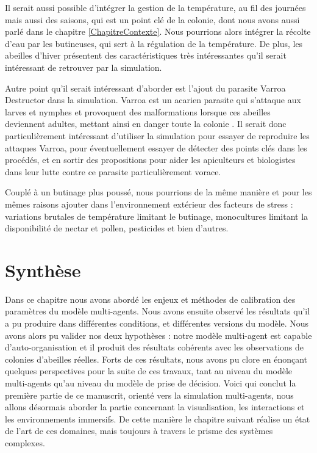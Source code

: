 	Il serait aussi possible d'intégrer la gestion de la température, au fil des journées mais aussi des saisons, qui est un point clé de la colonie, dont nous avons aussi parlé dans le chapitre \ref{ChapitreContexte}. Nous pourrions alors intégrer la récolte d'eau par les butineuses, qui sert à la régulation de la température. De plus, les abeilles d'hiver présentent des caractéristiques très intéressantes qu'il serait intéressant de retrouver par la simulation. 
	
	Autre point qu'il serait intéressant d'aborder est l'ajout du parasite Varroa Destructor dans la simulation. Varroa est un acarien parasite qui s'attaque aux larves et nymphes et provoquent des malformations lorsque ces abeilles deviennent adultes, mettant ainsi en danger toute la colonie \cite{le_conte_varroa_2010}. Il serait donc particulièrement intéressant d'utiliser la simulation pour essayer de reproduire les attaques Varroa, pour éventuellement essayer de détecter des points clés dans les procédés, et en sortir des propositions pour aider les apiculteurs et biologistes dans leur lutte contre ce parasite particulièrement vorace.
	
	Couplé à un butinage plus poussé, nous pourrions de la même manière et pour les mêmes raisons ajouter dans l'environnement extérieur des facteurs de stress : variations brutales de température limitant le butinage, monocultures limitant la disponibilité de nectar et pollen, pesticides et bien d'autres.
	
	
			
	\section*{Synthèse}
	Dans ce chapitre nous avons abordé les enjeux et méthodes de calibration des paramètres du modèle multi-agents. Nous avons ensuite observé les résultats qu'il a pu produire dans différentes conditions, et différentes versions du modèle. Nous avons alors pu valider nos deux hypothèses : notre modèle multi-agent est capable d'auto-organisation et il produit des résultats cohérents avec les observations de colonies d'abeilles réelles. Forts de ces résultats, nous avons pu clore en énonçant quelques perspectives pour la suite de ces travaux, tant au niveau du modèle multi-agents qu'au niveau du modèle de prise de décision. Voici qui conclut la première partie de ce manuscrit, orienté vers la simulation multi-agents, nous allons désormais aborder la partie concernant la visualisation, les interactions et les environnements immersifs. De cette manière le chapitre suivant réalise un état de l'art de ces domaines, mais toujours à travers le prisme des systèmes complexes.